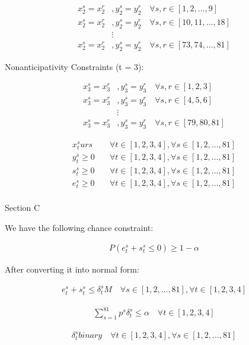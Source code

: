 \documentclass{article}
\begin{document}
\begin{align*}
        x_{2}^{s} = x_{2}^{r}&, y_{2}^{s} = y_{2}^{r} \quad \forall s, r \in [1, 2, \ldots, 9]\\
        x_{2}^{s} = x_{2}^{r}&, y_{2}^{s} = y_{2}^{r} \quad \forall s, r \in [10, 11, \ldots, 18]\\
        &\vdots\\
        x_{2}^{s} = x_{2}^{r}&, y_{2}^{s} = y_{2}^{r} \quad \forall s, r \in [73, 74, \ldots, 81]
\end{align*}

\par
Nonanticipativity Constraints (t = 3):

\begin{align*}
        x_{3}^{s} = x_{3}^{r}&, y_{3}^{s} = y_{3}^{r} \quad \forall s, r \in [1, 2, 3]\\
        x_{3}^{s} = x_{3}^{r}&, y_{3}^{s} = y_{3}^{r} \quad \forall s, r \in [4, 5, 6]\\
        &\vdots\\
        x_{3}^{s} = x_{3}^{r}&, y_{3}^{s} = y_{3}^{r} \quad \forall s, r \in [79, 80, 81]
\end{align*}

\begin{align*}
        x_{t}^{s} urs &\quad \forall t \in [1, 2, 3, 4], \forall s \in [1, 2, \ldots, 81]\\
        y_{t}^{s} \ge 0 &\quad \forall t \in [1, 2, 3, 4], \forall s \in [1, 2, \ldots, 81]\\
        s_{t}^{s} \ge 0 &\quad \forall t \in [1, 2, 3, 4], \forall s \in [1, 2, \ldots, 81]\\
        e_{t}^{s} \ge 0 &\quad \forall t \in [1, 2, 3, 4], \forall s \in [1, 2, \ldots, 81]\\
\end{align*}

\begin{center}
        \large Section C
\end{center}

\par
We have the following chance constraint:

\begin{align*}
        P(e_{t}^{s} + s_{t}^{s} \le 0) \ge 1 - \alpha
\end{align*}

After converting it into normal form:


\begin{align*}
        e_{t}^{s} + s_{t}^{s} \le \delta_{t}^{s} M \quad \forall s \in [1, 2, \ldots, 81], \forall t \in [1, 2, 3, 4]
\end{align*}

\begin{align*}
        \sum_{s = 1}^{81} p^{s} \delta_{t}^{s} \le \alpha \quad \forall t \in [1, 2, 3, 4]
\end{align*}

\begin{align*}
        \delta_{t}^{s} binary  \quad \forall t \in [1, 2, 3, 4], \forall s \in [1, 2, \ldots, 81]
\end{align*}
\end{document}
